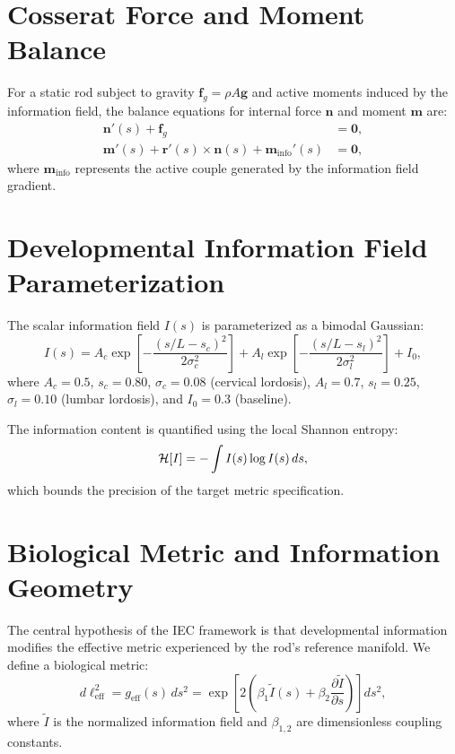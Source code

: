\section{Cosserat Force and Moment Balance}

For a static rod subject to gravity $\mathbf{f}_g = \rho A \mathbf{g}$ and active moments induced by the information field, the balance equations for internal force $\mathbf{n}$ and moment $\mathbf{m}$ are:
\begin{align}
\mathbf{n}'(s) + \mathbf{f}_g &= \mathbf{0}, \nonumber \\
\mathbf{m}'(s) + \mathbf{r}'(s) \times \mathbf{n}(s) + \mathbf{m}_{\mathrm{info}}'(s) &= \mathbf{0},
\end{align}
where $\mathbf{m}_{\mathrm{info}}$ represents the active couple generated by the information field gradient.

\section{Developmental Information Field Parameterization}

The scalar information field $I(s)$ is parameterized as a bimodal Gaussian:
\begin{equation}
I(s) = A_c \exp\left[-\frac{(s/L - s_c)^2}{2\sigma_c^2}\right] + A_l \exp\left[-\frac{(s/L - s_l)^2}{2\sigma_l^2}\right] + I_0,
\end{equation}
where $A_c = 0.5$, $s_c = 0.80$, $\sigma_c = 0.08$ (cervical lordosis), $A_l = 0.7$, $s_l = 0.25$, $\sigma_l = 0.10$ (lumbar lordosis), and $I_0 = 0.3$ (baseline).

The information content is quantified using the local Shannon entropy:
\begin{equation}
\mathcal{H}[I] = -\int I(s) \log I(s) \, ds,
\end{equation}
which bounds the precision of the target metric specification.

\section{Biological Metric and Information Geometry}

The central hypothesis of the IEC framework is that developmental information modifies the effective metric experienced by the rod's reference manifold. We define a biological metric:
\begin{equation}
d\ell_{\mathrm{eff}}^2 = g_{\mathrm{eff}}(s)\,ds^2 = \exp\left[2\left(\beta_1 \tilde{I}(s) + \beta_2 \frac{\partial \tilde{I}}{\partial s}\right)\right] ds^2,
\end{equation}
where $\tilde{I}$ is the normalized information field and $\beta_{1,2}$ are dimensionless coupling constants.

